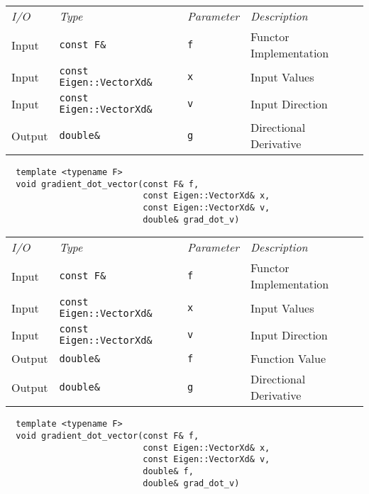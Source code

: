 \begin{tcolorbox}[colback=white,colframe=gray90, coltitle=black,boxrule=3pt,
fonttitle=\bfseries,title=Directional Derivative]

\begin{tabular}{llll}
\textit{I/O} & \textit{Type} & \textit{Parameter} & \textit{Description} \\
Input & \texttt{const F\&} & \texttt{f} & Functor Implementation \\
Input & \texttt{const Eigen::VectorXd\&} & \texttt{x} & Input Values \\
Input & \texttt{const Eigen::VectorXd\&} & \texttt{v} & Input Direction \\
Output & \texttt{double\&} & \texttt{g} & Directional Derivative
\end{tabular}

\vspace{5mm}

\begin{verbatim}
  template <typename F>
  void gradient_dot_vector(const F& f,
                           const Eigen::VectorXd& x,
                           const Eigen::VectorXd& v,
                           double& grad_dot_v)
\end{verbatim}

\end{tcolorbox}

\begin{tcolorbox}[colback=white,colframe=gray90, coltitle=black,boxrule=3pt,
fonttitle=\bfseries,title=Directional Derivative]

\begin{tabular}{llll}
\textit{I/O} & \textit{Type} & \textit{Parameter} & \textit{Description} \\
Input & \texttt{const F\&} & \texttt{f} & Functor Implementation \\
Input & \texttt{const Eigen::VectorXd\&} & \texttt{x} & Input Values \\
Input & \texttt{const Eigen::VectorXd\&} & \texttt{v} & Input Direction \\
Output & \texttt{double\&} & \texttt{f} & Function Value \\
Output & \texttt{double\&} & \texttt{g} & Directional Derivative
\end{tabular}

\vspace{5mm}

\begin{verbatim}
  template <typename F>
  void gradient_dot_vector(const F& f,
                           const Eigen::VectorXd& x,
                           const Eigen::VectorXd& v,
                           double& f,
                           double& grad_dot_v)
\end{verbatim}

\end{tcolorbox}

